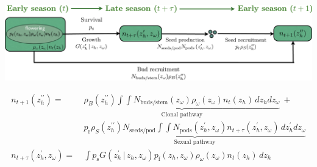 \documentclass[10pt]{article}
\begin{document}
\begin{framed}

\begin{center}
\includegraphics[width=5.5in]{LifeCycleDiagram.pdf}

\begin{align*}
n_{t+1}(z_{h}^{\prime\prime}) = \ & \underbrace{\rho_{B}(z_{h}^{\prime\prime})\int\int N_{\mathrm{buds/stem}}(z_{\omega})\rho_{\omega}(z_{\omega})n_{t}(z_{h})\, dz_{h}dz_{\omega}}_\text{Clonal pathway} \ + \\
  & \underbrace{p_{\mathrm{r}}\rho_{S}(z_{h}^{\prime\prime})N_{\mathrm{seeds/pod}}\int\int N_{\mathrm{pods}}\left(z_{h}^{\prime},z_{\omega}\right)n_{t+\tau}(z_{h}^{\prime},z_{\omega}) \,dz_{h}^{\prime}dz_{\omega}}_\text{Sexual pathway} \\
n_{t+\tau}(z_{h}^{\prime},z_{\omega}) = \ & \int p_{\mathrm{s}} G(z_{h}^{\prime}\, | \, z_{h},z_{\omega})p_{\mathrm{f}}(z_{h},z_{\omega})\rho_{\omega}(z_{\omega})n_{t}(z_{h})\, dz_{h}
\end{align*}

\end{center}

\vspace{0.35in}


\end{framed}
\end{document}
